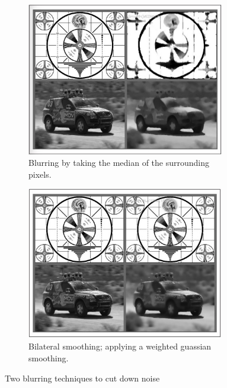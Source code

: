 \begin{figure}
\centering
\begin{subfigure}{0.4\textwidth}
 \centering
 \includegraphics[width=0.95\textwidth]{"./image/median_blurring"}
 \caption{Blurring by taking the median of the surrounding pixels.}
 \label{fig:blurring:sub1}
\end{subfigure}
\begin{subfigure}{0.4\textwidth}
 \centering
 \includegraphics[width=0.95\textwidth]{"./image/bilateral_smoothing"}
 \caption{Bilateral smoothing; applying a weighted guassian smoothing.}
 \label{fig:blurring:sub2}
\end{subfigure}
\caption{Two blurring techniques to cut down noise}
\label{fig:blurring}
\end{figure}

